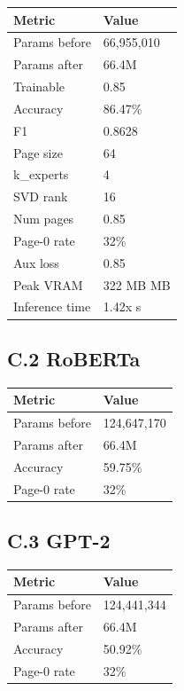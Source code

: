 \begin{table}[H]
\centering
\small
\begin{tabular}{ll}
\toprule
\textbf{Metric} & \textbf{Value} \\
\midrule
Params before & 66,955,010 \\
Params after & 66.4M \\
Trainable & 0.85 \\
Accuracy & 86.47\% \\
F1 & 0.8628 \\
Page size & 64 \\
k\_experts & 4 \\
SVD rank & 16 \\
Num pages & 0.85 \\
Page-0 rate & 32\% \\
Aux loss & 0.85 \\
Peak VRAM & 322 MB MB \\
Inference time & 1.42x s \\
\bottomrule
\end{tabular}
\end{table}

\subsection{C.2 RoBERTa}

\begin{table}[H]
\centering
\small
\begin{tabular}{ll}
\toprule
\textbf{Metric} & \textbf{Value} \\
\midrule
Params before & 124,647,170 \\
Params after & 66.4M \\
Accuracy & 59.75\% \\
Page-0 rate & 32\% \\
\bottomrule
\end{tabular}
\end{table}

\subsection{C.3 GPT-2}

\begin{table}[H]
\centering
\small
\begin{tabular}{ll}
\toprule
\textbf{Metric} & \textbf{Value} \\
\midrule
Params before & 124,441,344 \\
Params after & 66.4M \\
Accuracy & 50.92\% \\
Page-0 rate & 32\% \\
\bottomrule
\end{tabular}
\end{table}

